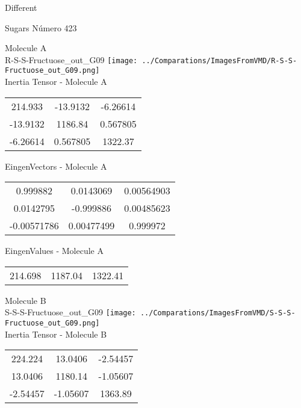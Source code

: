 \begin{center}
\vtab
\vtab
\textcolor{NavyBlue}{\Large Different}
\end{center}

 \newpage

\vtab[-2cm]
\begin{center}
{\large Sugars \tab Número 423}
\end{center}
\begin{multicols}{2}
\begin{center}

Molecule A \\ 
R-S-S-Fructuose\_out\_G09
\texttt{[image: ../Comparations/ImagesFromVMD/R-S-S-Fructuose\_out\_G09.png]}
\\
Inertia Tensor - Molecule A \\
\vtab

\begin{tabular}{|c c c|}
214.933	 & 	-13.9132	 & 	-6.26614	 \\
-13.9132	 & 	1186.84	 & 	0.567805	 \\
-6.26614	 & 	0.567805	 & 	1322.37
\end{tabular}

\vtab
 EingenVectors - Molecule A     \\
\vtab
\begin{tabular}{|c c c|}
0.999882	 & 	0.0143069	 & 	0.00564903	 \\
0.0142795	 & 	-0.999886	 & 	0.00485623	 \\
-0.00571786	 & 	0.00477499	 & 	0.999972
\end{tabular}

\vtab
 EingenValues - Molecule A     \\
\vtab
\begin{tabular}{|c c c|}
214.698	 & 	1187.04	 & 	1322.41	 \\
\end{tabular}
\columnbreak

Molecule B \\ 
S-S-S-Fructuose\_out\_G09
\texttt{[image: ../Comparations/ImagesFromVMD/S-S-S-Fructuose\_out\_G09.png]}
\\
Inertia Tensor - Molecule B \\
\vtab

\begin{tabular}{|c c c|}
224.224	 & 	13.0406	 & 	-2.54457	 \\
13.0406	 & 	1180.14	 & 	-1.05607	 \\
-2.54457	 & 	-1.05607	 & 	1363.89
\end{tabular}


\end{center}
\end{multicols}
